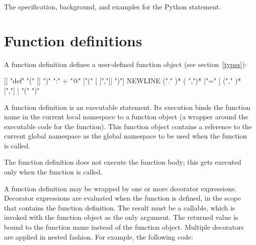 \begin{seealso}
         {The specification, background, and examples for the
          Python  statement.}
\end{seealso}

\section{Function definitions\label{function}}

A function definition defines a user-defined function object (see
section~\ref{types}):

\begin{productionlist}
             {[] "def"  "(" [] ")"
              ":" }
             {+}
             {"@"  ["(" [ [","]] ")"] NEWLINE}
             { ("." )*}
                 {( ",")*}
             { ["=" ]}
             { ("," )* [","]}
             { | "("  ")"}
             {}
\end{productionlist}

A function definition is an executable statement.  Its execution binds
the function name in the current local namespace to a function object
(a wrapper around the executable code for the function).  This
function object contains a reference to the current global namespace
as the global namespace to be used when the function is called.

The function definition does not execute the function body; this gets
executed only when the function is called.

A function definition may be wrapped by one or more decorator expressions.
Decorator expressions are evaluated when the function is defined, in the scope
that contains the function definition.  The result must be a callable,
which is invoked with the function object as the only argument.
The returned value is bound to the function name instead of the function
object.  Multiple decorators are applied in nested fashion.
For example, the following code:

